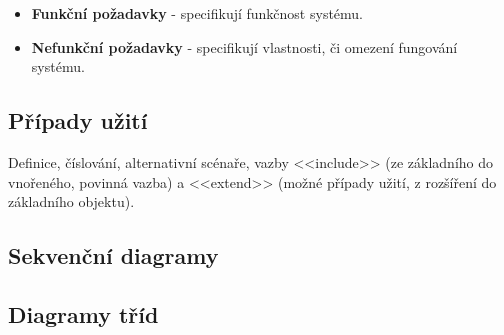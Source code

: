 \begin{itemize}
    \item \textbf{Funkční požadavky} - specifikují funkčnost systému.
    \item \textbf{Nefunkční požadavky} - specifikují vlastnosti, či omezení fungování systému.
\end{itemize}

\subsection{Případy užití}

Definice, číslování, alternativní scénaře, vazby <<include>> (ze základního do vnořeného, povinná vazba) a <<extend>> (možné případy užití, z rozšíření do základního objektu).

\subsection{Sekvenční diagramy}

\subsection{Diagramy tříd}